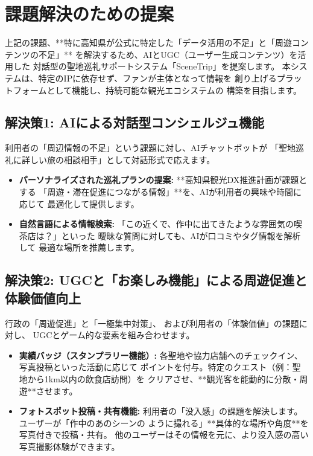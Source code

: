 \documentclass{docs}
\begin{document}
\section{課題解決のための提案}
上記の課題、**特に高知県が公式に特定した「データ活用の不足」と「周遊コンテンツの不足」\cite{kochi_dx_plan}**
を解決するため、AIとUGC（ユーザー生成コンテンツ）を活用した
対話型の聖地巡礼サポートシステム「SceneTrip」を提案します。
本システムは、特定のIPに依存せず、ファンが主体となって情報を
創り上げるプラットフォームとして機能し、持続可能な観光エコシステムの
構築を目指します。

\subsection{解決策1: AIによる対話型コンシェルジュ機能}
利用者の「周辺情報の不足」という課題に対し、AIチャットボットが
「聖地巡礼に詳しい旅の相談相手」として対話形式で応えます。
\begin{itemize}
    \item \textbf{パーソナライズされた巡礼プランの提案:}
    **高知県観光DX推進計画\cite{kochi_dx_plan}が課題とする
    「周遊・滞在促進につながる情報」**を、AIが利用者の興味や時間に応じて
    最適化して提供します。
    \item \textbf{自然言語による情報検索:}
    「この近くで、作中に出てきたような雰囲気の喫茶店は？」といった
    曖昧な質問に対しても、AIが口コミやタグ情報を解析して
    最適な場所を推薦します。
\end{itemize}

\subsection{解決策2: UGCと「お楽しみ機能」による周遊促進と体験価値向上}
行政の「周遊促進」\cite{kochi_r7_plan}と「一極集中対策」\cite{jalan_overtourism, kanko_overtourism}、
および利用者の「体験価値」\cite{toppan2025}の課題に対し、
UGCとゲーム的な要素を組み合わせます。
\begin{itemize}
    \item \textbf{実績バッジ（スタンプラリー機能）:}
    各聖地や協力店舗へのチェックイン、写真投稿といった活動に応じて
    ポイントを付与。特定のクエスト（例：聖地から1km以内の飲食店訪問）を
    クリアさせ、**観光客を能動的に分散・周遊**させます。
    \item \textbf{フォトスポット投稿・共有機能:}
    利用者の「没入感」の課題を解決します。ユーザーが「作中のあのシーンの
    ように撮れる」**具体的な場所や角度**を写真付きで投稿・共有。
    他のユーザーはその情報を元に、より没入感の高い写真撮影体験ができます。
\end{itemize}
\end{document}

